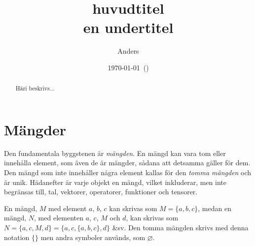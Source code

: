\documentclass[a4paper, article, oneside, leqno]{memoir}
\title{
  huvudtitel \\ %
  \large en undertitel%
}
\author{Anders}
\date{\today\ (\currenttime)}
\begin{document}

\maketitle

\begin{abstract}
  Häri beskrivs...
\end{abstract}

\clearpage

\tableofcontents


\clearpage



\chapter{Mängder}
Den fundamentala byggstenen är \emph{mängden}. En mängd kan vara tom eller innehålla element, som även de är mängder, sådana att detsamma gäller för dem. Den mängd som inte innehåller några element kallas för den \emph{tomma mängden} och är unik. Hädanefter är varje objekt en mängd, vilket inkluderar, men inte begränsas till, tal, vektorer, operatorer, funktioner och tensorer.

En mängd, $M$ med element $a$, $b$, $c$ kan skrivas som $M = \{a, b, c\}$, medan en mängd, $N$, med elementen $a$, $c$, $M$ och $d$, kan skrivas som $N = \{a, c, M, d\} = \{a, c, \{a, b, c\}, d\}$ \&sv. Den tomma mängden skrivs med denna notation $\{\}$ men andra symboler används, som $\varnothing$.


\clearpage
\end{document}
